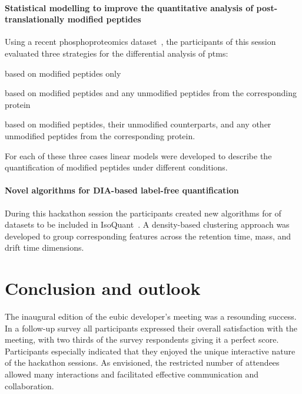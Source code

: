 \documentclass[fontsize=11pt, paper=a4, titlepage=false]{scrartcl}
\begin{document}
\paragraph{Statistical modelling to improve the quantitative analysis of 
post-translationally modified peptides}

Using a recent phosphoproteomics dataset~\autocite{Rabiee2017}, the 
participants of this session evaluated three strategies for the 
differential analysis of \glspl{ptm}:
\begin{enumerate*}[label=(\roman*),itemjoin={{, }},itemjoin*={{, 
and }},afterlabel=\unskip{{~}}]
\item based on modified peptides only
\item based on modified peptides and any unmodified peptides from the 
corresponding protein
\item based on modified peptides, their unmodified counterparts, and any other 
unmodified peptides from the corresponding protein.
\end{enumerate*}
For each of these three cases linear models were developed to describe the 
quantification of modified peptides under different conditions.

\paragraph{Novel algorithms for DIA-based label-free quantification}

During this hackathon session the participants created new algorithms for 
 of  datasets to be included in 
IsoQuant~\autocite{Distler2014}. A density-based clustering approach was 
developed to group corresponding features across the retention time, mass, and 
drift time dimensions.

\section{Conclusion and outlook}

The inaugural edition of the \gls{eubic} developer's meeting was a resounding 
success. In a follow-up survey all participants expressed their overall 
satisfaction with the meeting, with two thirds of the survey respondents giving 
it a perfect score. Participants especially indicated that they enjoyed the 
unique interactive nature of the hackathon sessions. As envisioned, the restricted 
number of attendees allowed many interactions and facilitated effective 
communication and collaboration.
\end{document}
